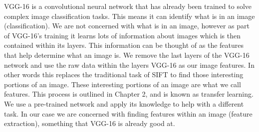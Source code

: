   VGG-16 is a convolutional neural network that has already been trained to solve complex image classification tasks. This means it can identify what is in an image (classification). We are not concerned with what is in an image, however as part of VGG-16's training it learns lots of information about images which is then contained within its layers. This information can be thought of as the features that help determine what an image is. We remove the last layers of the VGG-16 network and use the raw data within the layers VGG-16 as our image features. In other words this replaces the traditional task of SIFT to find those interesting portions of an image. These interesting portions of an image are what we call features. This process is outlined in Chapter 2, and is known as transfer learning. We use a pre-trained network and apply its knowledge to help with a different task. In our case we are concerned with finding features within an image (feature extraction), something that VGG-16 is already good at.